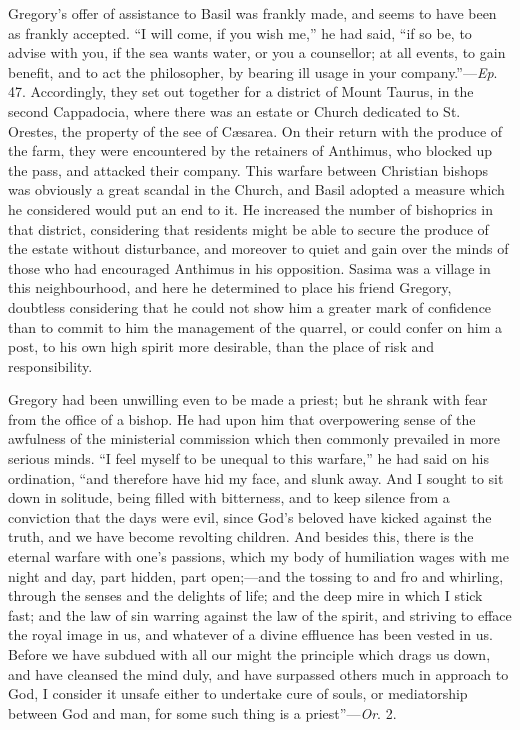 Gregory's offer of assistance to Basil was frankly made, and seems
to have been as frankly accepted. ``I will come, if you wish
me,'' he had said, ``if so be, to advise with you, if the sea
wants water, or you a counsellor; at all events, to gain benefit, and
to act the philosopher, by bearing ill usage in your company.''—\emph{Ep}.
47. Accordingly, they set out together for a district of Mount Taurus,
in the second Cappadocia, where there was an estate or Church
dedicated to St. Orestes, the property of the see of Cæsarea. On
their return with the produce of the farm, they were encountered by
the retainers of Anthimus, who blocked up the pass, and attacked their
company. This warfare between Christian bishops was obviously a great
scandal in the Church, and Basil adopted a measure which he considered
would put an end to it. He increased the number of bishoprics in that
district, considering that residents might be able to secure the
produce of the estate without disturbance, and moreover to quiet and
gain over the minds of those who had encouraged Anthimus in his
opposition. Sasima was a village in this neighbourhood, and here he
determined to place his friend Gregory, doubtless considering that he could not show him a greater mark of confidence than to commit
to him the management of the quarrel, or could confer on him a post,
to his own high spirit more desirable, than the place of risk and
responsibility.

Gregory had been unwilling even to be made a priest; but he shrank
with fear from the office of a bishop. He had upon him that
overpowering sense of the awfulness of the ministerial commission
which then commonly prevailed in more serious minds. ``I feel
myself to be unequal to this warfare,'' he had said on his
ordination, ``and therefore have hid my face, and slunk away. And
I sought to sit down in solitude, being filled with bitterness, and to
keep silence from a conviction that the days were evil, since God's
beloved have kicked against the truth, and we have become revolting
children. And besides this, there is the eternal warfare with one's
passions, which my body of humiliation wages with me night and day,
part hidden, part open;—and the tossing to and fro and whirling,
through the senses and the delights of life; and the deep mire in
which I stick fast; and the law of sin warring against the law of the
spirit, and striving to efface the royal image in us, and whatever of
a divine effluence has been vested in us. Before we have subdued with
all our might the principle which drags us down, and have cleansed the
mind duly, and have surpassed others much in approach to God, I
consider it unsafe either to undertake cure of souls, or mediatorship
between God and man, for some such thing is a priest''—\emph{Or}.
2.


